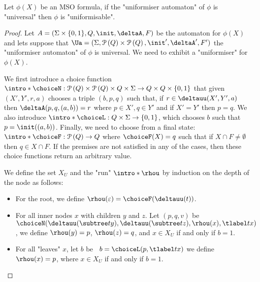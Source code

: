 \documentclass[a4paper,UKenglish,cleveref, autoref, thm-restate]{lipics-v2021}
\begin{document}
\begin{lemma}\label{lemma:universal-implies-uniformisable}
	Let $\phi(X)$ be an MSO formula, if the "uniformiser automaton" of $\phi$ is "universal" then $\phi$ is "uniformisable".
\end{lemma}
\begin{proof}
	Let $A =  (\Sigma \times \{0,1\}, Q, \init, \deltaA, F)$ be the automaton for $\phi(X)$ and lets suppose that
	$\Ua = (\Sigma, \parts Q \times \parts Q,\init', \deltaA', F')$ the "uniformiser automaton" of $\phi$ is universal.
	We need to exhibit a "uniformiser" for $\phi(X)$.

	\AP We first introduce a choice function $\intro*\choiceN : \parts Q \times \parts Q \times Q \times \Sigma \to Q \times Q \times \set{0,1}$
	that given $(X',Y',r,a)$ chooses a triple $(b,p,q)$ such that, if $r \in \deltauu(X',Y', a)$ then $\deltaA(p,q,(a,b)) = r$ where $p \in X', q \in Y'$
	and if $X' = Y'$ then $p = q$.
	We also introduce $\intro* \choiceL : Q \times \Sigma \to \set{0,1} $, which chooses
	$b$ such that $p = \init((a,b))$.
	Finally, we need to choose from a final state: $\intro* \choiceF : \parts Q \to  Q$ where
	$\choiceF (X) = q$ such that if $X \cap F \neq \emptyset$ then $q \in X \cap F$. If the premises are not satisfied in any of the cases, then
	these choice functions return an arbitrary value.

	\AP We define the set $X_U$ and the "run" $\intro*\rhou$  by induction on the depth of the node as follows:
	\begin{itemize}
		\item For the root, we define $\rhou(\varepsilon) = \choiceF(\deltauu(t))$.
		\item For all inner nodes $x$ with children $y$ and $z$. Let $(p,q,v)$ be $\choiceN(\deltauu(\subtree t y), \deltauu(\subtree t z), \rhou(x), \tlabel t x)$, we define
		      $\rhou(y)=p$, $\rhou(z)=q$, and $x \in X_U$ if and only if $b = 1$.
		\item For all "leaves" $x$, let $b$ be ~$b = \choiceL(p, \tlabel t x)$ we define $\rhou (x) = p$, where $x \in X_U$ if and only if $b = 1$.
	\end{itemize}


\end{proof}
\end{document}
